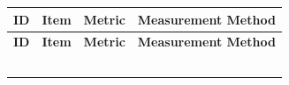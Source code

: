 \documentclass[10pt,letterpaper]{article}
\renewcommand\arraystretch{1.25}
\begin{document}
\begin{center}
\begingroup
\setlength\tabcolsep{2.0pt}
\footnotesize
\renewcommand\arraystretch{1.55}
\begin{longtable}{|>{\raggedright\arraybackslash}p{1.558in}|>{\raggedright\arraybackslash}p{1.558in}|>{\raggedright\arraybackslash}p{1.558in}|>{\raggedright\arraybackslash}p{1.558in}|}
\hline
\rowcolor{light}
\textbf{ID} & \textbf{Item} & \textbf{Metric} & \textbf{Measurement Method} \\ \hline
\endfirsthead
\hline\rowcolor{light} \textbf{ID} & \textbf{Item} & \textbf{Metric} & \textbf{Measurement Method} \\ \hline
\endhead
\rule{0pt}{11pt}\hspace{0pt} & \rule{0pt}{11pt}\hspace{0pt} & \rule{0pt}{11pt}\hspace{0pt} & \rule{0pt}{11pt}\hspace{0pt} \\ \hline
\rule{0pt}{11pt}\hspace{0pt} & \rule{0pt}{11pt}\hspace{0pt} & \rule{0pt}{11pt}\hspace{0pt} & \rule{0pt}{11pt}\hspace{0pt} \\ \hline
\rule{0pt}{11pt}\hspace{0pt} & \rule{0pt}{11pt}\hspace{0pt} & \rule{0pt}{11pt}\hspace{0pt} & \rule{0pt}{11pt}\hspace{0pt} \\ \hline
\rule{0pt}{11pt}\hspace{0pt} & \rule{0pt}{11pt}\hspace{0pt} & \rule{0pt}{11pt}\hspace{0pt} & \rule{0pt}{11pt}\hspace{0pt} \\ \hline
\rule{0pt}{11pt}\hspace{0pt} & \rule{0pt}{11pt}\hspace{0pt} & \rule{0pt}{11pt}\hspace{0pt} & \rule{0pt}{11pt}\hspace{0pt} \\ \hline
\end{longtable}
\endgroup
\end{center}
\end{document}
